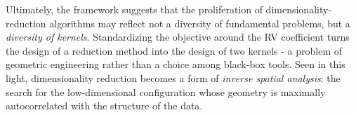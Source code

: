 \documentclass[11pt]{article}
\begin{document}
	Ultimately, the framework suggests that the proliferation of dimensionality-reduction algorithms may reflect not a diversity of fundamental problems, but a \emph{diversity of kernels}. Standardizing the objective around the RV coefficient turns the design of a reduction method into the design of two kernels - a problem of geometric engineering rather than a choice among black-box tools. Seen in this light, dimensionality reduction becomes a form of \emph{inverse spatial analysis}: the search for the low-dimensional configuration whose geometry is maximally autocorrelated with the structure of the data.
	
	
	 
	
\end{document}
